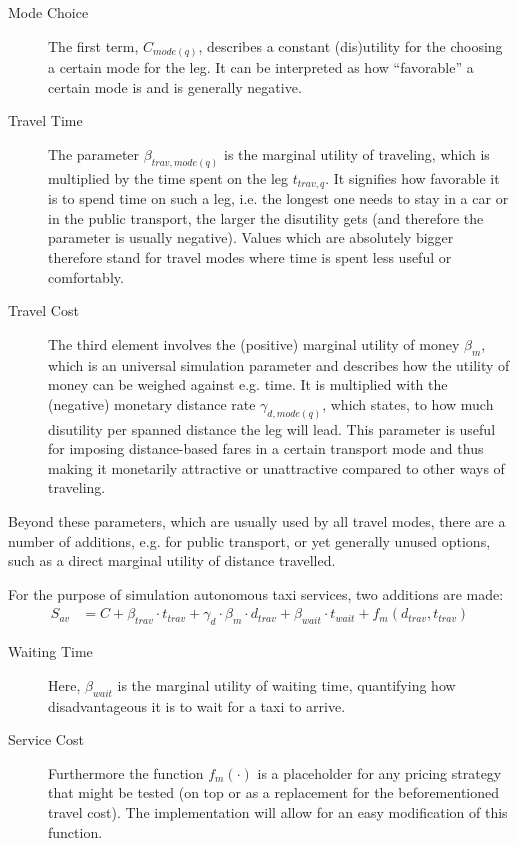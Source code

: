 \begin{description}

\item[Mode Choice] The first term, $C_{mode(q)}$, describes a constant (dis)utility for the
choosing a certain mode for the leg. It can be interpreted as how ``favorable''
a certain mode is and is generally negative.

\item[Travel Time] The parameter $\beta_{trav,mode(q)}$ is the marginal utility of traveling,
which is multiplied by the time spent on the leg $t_{trav,q}$. It signifies how
favorable it is to spend time on such a leg, i.e. the longest one needs to stay
in a car or in the public transport, the larger the disutility gets (and therefore
the parameter is usually negative). Values which are absolutely bigger therefore
stand for travel modes where time is spent less useful or comfortably.

\item[Travel Cost] The third element involves the (positive) marginal utility of money $\beta_{m}$,
which is an universal simulation parameter and describes how the utility of money can
be weighed against e.g. time.
It is multiplied with the (negative) monetary distance rate
$\gamma_{d,mode(q)}$, which states, to how much disutility per spanned
distance the leg will lead. This parameter is useful for imposing distance-based
fares in a certain transport mode and thus making it monetarily attractive or
unattractive compared to other ways of traveling.

\end{description}

Beyond these parameters, which are usually used by all travel modes, there are
a number of additions, e.g. for public transport, or yet generally unused options, such
as a direct marginal utility of distance travelled.

For the purpose of simulation autonomous taxi services, two additions are made:
\begin{equation}\begin{aligned}
S_{av} &= C + \beta_{trav} \cdot t_{trav} + \gamma_d \cdot \beta_m \cdot d_{trav} + \beta_{wait} \cdot t_{wait} + f_m(d_{trav},t_{trav})
\end{aligned}\end{equation}

\begin{description}

\item[Waiting Time] Here, $\beta_{wait}$ is the marginal utility of waiting time, quantifying
how disadvantageous it is to wait for a taxi to arrive.

\item[Service Cost] Furthermore the function
$f_m(\cdot)$ is a placeholder for any pricing strategy that might be tested (on top or as a replacement for the beforementioned travel cost). The
implementation will allow for an easy modification of this function.

\end{description}


